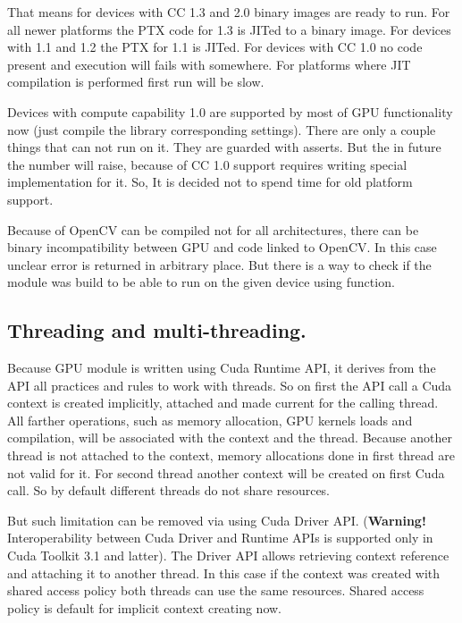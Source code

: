 That means for devices with CC 1.3 and 2.0 binary images are ready to run. For all newer platforms the PTX code for 1.3 is JITed to a binary image. For devices with 1.1 and 1.2 the PTX for 1.1 is JITed. For devices with CC 1.0 no code present and execution will fails with  somewhere. For platforms where JIT compilation is performed first run will be slow.

Devices with compute capability 1.0 are supported by most of GPU functionality now (just compile the library corresponding settings).  There are only a couple things that can not run on it. They are guarded with asserts. But the in future the number will raise, because of CC 1.0 support requires writing special implementation for it. So, It is decided not to spend time for old platform support.

Because of OpenCV can be compiled not for all architectures, there can be binary incompatibility between GPU and code linked to OpenCV. In this case unclear error is returned in arbitrary place. But there is a way to check if the module was build to be able to run on the given device using  function.


\subsection{Threading and multi-threading.}

Because GPU module is written using Cuda Runtime API, it derives from the API all practices and rules to work with threads. So on first the API call a Cuda context is created implicitly, attached and made current for the calling thread. All farther operations, such as memory allocation, GPU kernels loads and compilation, will be associated with the context and the thread. Because another thread is not attached to the context, memory allocations done in first thread are not valid for it. For second thread another context will be created on first Cuda call. So by default different threads do not share resources.

But such limitation can be removed via using Cuda Driver API. (\textbf{Warning!} Interoperability between Cuda Driver and Runtime APIs is supported only in Cuda Toolkit 3.1 and latter). The Driver API allows retrieving context reference and attaching it to another thread. In this case if the context was created with shared access policy both threads can use the same resources. Shared access policy is default for implicit context creating now. 

